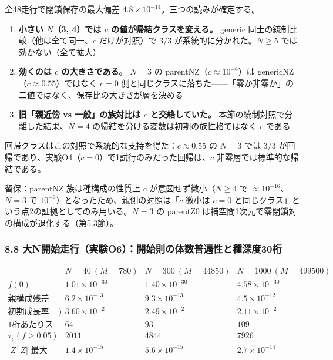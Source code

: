 \documentclass[
  a4paper,
]{ltjsarticle}
\providecommand{\tightlist}{%
  \setlength{\itemsep}{0pt}\setlength{\parskip}{0pt}}
\begin{document}
全48走行で閉鎖保存の最大偏差
\(4.8\times10^{-14}\)。三つの読みが確定する。

\begin{enumerate}
\def\labelenumi{\arabic{enumi}.}
\tightlist
\item
  \textbf{小さい \(N\)（3, 4）では \(c\) の値が帰結クラスを変える。}
  generic 同士の統制比較（他は全て同一、\(c\) だけが対照）で 3/3
  が系統的に分かれた。\(N\ge5\) では効かない（全て拡大）
\item
  \textbf{効くのは \(c\) の大きさである。} \(N=3\) の
  parentNZ（\(c\approx10^{-6}\)）は
  genericNZ（\(c\approx0.55\)）ではなく \(c=0\)
  側と同じクラスに落ちた------「零か非零か」の二値ではなく、保存比の大きさが層を決める
\item
  \textbf{旧「親近傍 vs 一般」の族対比は \(c\) と交絡していた。}
  本節の統制対照で分離した結果、\(N=4\)
  の帰結を分ける変数は初期の族性格ではなく \(c\) である
\end{enumerate}

回帰クラスはこの対照で系統的な支持を得た：\(c\approx0.55\) の \(N=3\)
では 3/3 が回帰であり、実験O4（\(c=0\)）で1試行のみだった回帰は、\(c\)
非零層では標準的な帰結である。

留保：parentNZ 族は種構成の性質上 \(c\) が意図せず微小（\(N\ge4\) で
\(\approx10^{-16}\)、\(N=3\) で
\(10^{-6}\)）となったため、親側の対照は「\(c\) 微小は \(c=0\)
と同じクラス」という点2の証拠としてのみ用いる。\(N=3\) の parentZ0
は補空間1次元で零閉鎖対の構成が退化する（第5.3節）。

\subsubsection{8.8
大N開始走行（実験O6）：開始則の体数普遍性と種深度30桁}\label{ux5927nux958bux59cbux8d70ux884cux5b9fux9a13o6ux958bux59cbux5247ux306eux4f53ux6570ux666eux904dux6027ux3068ux7a2eux6df1ux5ea630ux6841}

\[
\begin{array}{c|ccc}
 & N=40\ (M=780) & N=300\ (M=44850) & N=1000\ (M=499500)\\\hline
f(0) & 1.01\times10^{-30} & 1.40\times10^{-30} & 4.58\times10^{-30}\\
\text{親構成残差} & 6.2\times10^{-13} & 9.3\times10^{-13} & 4.5\times10^{-12}\\
\text{初期成長率（/step}) & 3.60\times10^{-2} & 2.49\times10^{-2} & 2.11\times10^{-2}\\
\text{1桁あたりステップ数} & 64 & 93 & 109\\
\tau_c(f\ge0.05) & 2011 & 4844 & 7926\\
\lvert Z^{\mathsf T}Z\rvert\text{ 最大} & 1.4\times10^{-15} & 5.6\times10^{-15} & 2.7\times10^{-14}
\end{array}
\]
\end{document}
